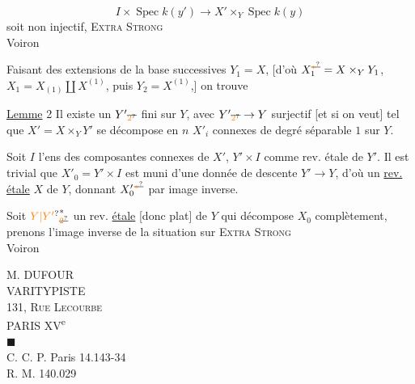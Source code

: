 \[
I\times\operatorname{Spec}k(y')\longrightarrow X'\times_Y\operatorname{Spec}k(y)
\]
soit  non injectif,
\textsc{Extra Strong}\\
 Voiron

Faisant des extensions de la base successives $Y_1=X$, [d'où $X_1^{\deleted{\unsure{*}}}=X\times_Y Y_1$, $X_1=X_{(1)}\amalg X^{(1)}$, puis $Y_2=X^{(1)}$,] on trouve

\uline{Lemme} 2 Il existe un $Y'\deleted{_{\unsure{2}}}$  fini sur $Y$, avec $Y'\deleted{_{\unsure{2}}}\to Y$ surjectif [et   si on veut] tel que $X'=X\times_Y Y'$ se décompose en $n$  $X'_i$ connexes de degré  séparable $1$ sur $Y$.

Soit $I$ l'ens des composantes connexes de $X'$,  $Y'\times I$ comme rev. étale de $Y'$. Il est trivial que $X'_0=Y'\times I$ est muni d'une donnée de descente  $Y'\to Y$, d'où un \uline{rev.} \uline{étale} $X$ de $Y$, donnant $X'_0{}^{\deleted{\unsure{*}}}$ par image inverse.


Soit ${\unsure{Y|Y'}}^{*}_{\deleted{\unsure{2}}}$ un rev. \uline{étale} [donc plat] de $Y$ qui décompose $X_0$ complètement, prenons l'image inverse de la situation sur
\textsc{Extra Strong}\\
 Voiron

M. DUFOUR\\
VARITYPISTE\\
131, \textsc{Rue Lecourbe}\\
PARIS XV\textsuperscript{e}\\
$\blacksquare$\\
C. C. P. Paris 14.143-34\\
R. M. 140.029

